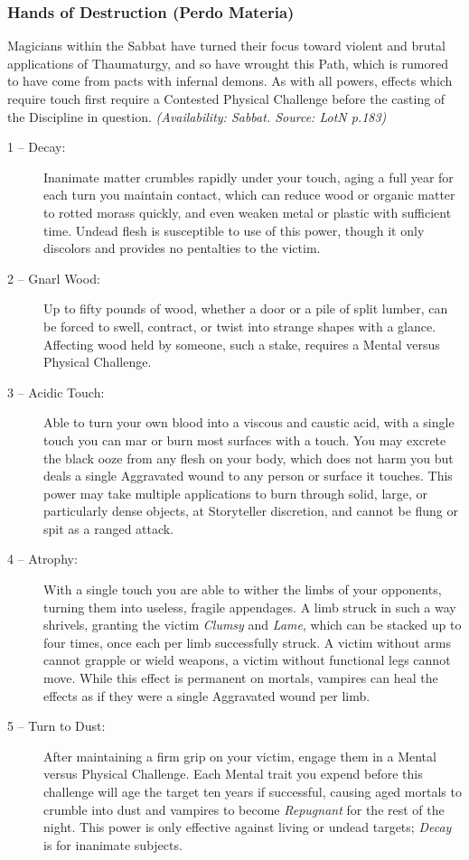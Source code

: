 \subsubsection{Hands of Destruction (Perdo Materia)}
Magicians within the Sabbat have turned their focus toward violent and brutal applications of Thaumaturgy, and so have 
wrought this Path, which is rumored to have come from pacts with infernal demons.  As with all powers, effects which require 
touch first require a Contested Physical Challenge before the casting of the Discipline in question.  \emph{(Availability: 
Sabbat.  Source: LotN p.183)}

\begin{description}
	\item[1 -- Decay:]  Inanimate matter crumbles rapidly under your touch, aging a full year for each turn you 
	maintain contact, which can reduce wood or organic matter to rotted morass quickly, and even weaken metal or plastic 
	with sufficient time.  Undead flesh is susceptible to use of this power, though it only discolors and provides no 
	pentalties to the victim.
	\item[2 -- Gnarl Wood:]  Up to fifty pounds of wood, whether a door or a pile of split lumber, can be forced 
	to swell, contract, or twist into strange shapes with a glance.  Affecting wood held by someone, such a stake, requires 
	a Mental versus Physical Challenge.
	\item[3 -- Acidic Touch:]  Able to turn your own blood into a viscous and caustic acid, with a single touch you 
	can mar or burn most surfaces with a touch.  You may excrete the black ooze from any flesh on your body, which 
	does not harm you but deals a single Aggravated wound to any person or surface it touches.  This power may take 
	multiple applications to burn through solid, large, or particularly dense objects, at Storyteller discretion, and 
	cannot be flung or spit as a ranged attack.
	\item[4 -- Atrophy:]  With a single touch you are able to wither the limbs of your opponents, turning them into 
	useless, fragile appendages.  A limb struck in such a way shrivels, granting the victim \emph{Clumsy} and 
	\emph{Lame}, which can be stacked up to four times, once each per limb successfully struck.  A victim without 
	arms cannot grapple or wield weapons, a victim without functional legs cannot move.  While this effect is permanent 
	on mortals, vampires can heal the effects as if they were a single Aggravated wound per limb.
	\item[5 -- Turn to Dust:]  After maintaining a firm grip on your victim, engage them in a Mental versus Physical 
	Challenge.  Each Mental trait you expend before this challenge will age the target ten years if successful, causing 
	aged mortals to crumble into dust and vampires to become \emph{Repugnant} for the rest of the night.  This power 
	is only effective against living or undead targets; \emph{Decay} is for inanimate subjects.
\end{description}

